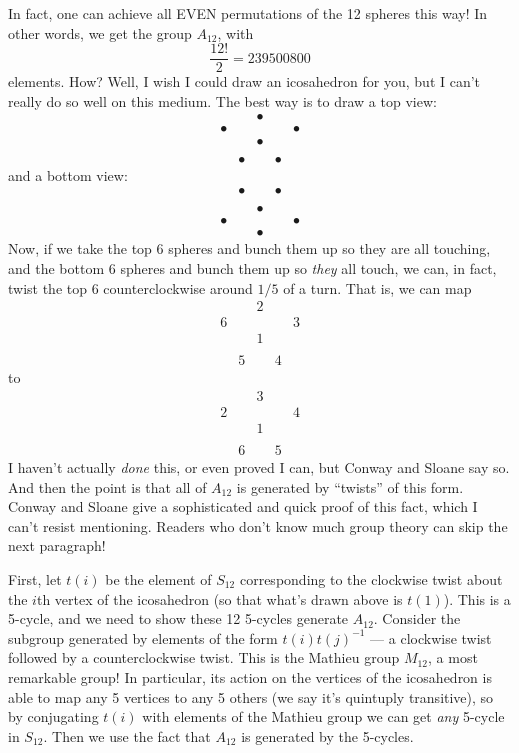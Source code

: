 \documentclass{article}
\begin{document}
In fact, one can achieve all EVEN permutations of the 12 spheres this
way! In other words, we get the group \(A_{12}\), with
\[\frac{12!}{2} = 239500800\] elements. How? Well, I wish I could draw
an icosahedron for you, but I can't really do so well on this medium.
The best way is to draw a top view: \[
  \begin{array}{ccccc}
    &&\bullet&&
  \\\bullet&&&&\bullet
  \\&&\bullet&&
  \\
  \\&\bullet&&\bullet&
  \end{array}
\] and a bottom view: \[
  \begin{array}{ccccc}
    &\bullet&&\bullet&
  \\
  \\&&\bullet&&
  \\\bullet&&&&\bullet
  \\&&\bullet&&
  \end{array}
\] Now, if we take the top 6 spheres and bunch them up so they are all
touching, and the bottom 6 spheres and bunch them up so \emph{they} all
touch, we can, in fact, twist the top 6 counterclockwise around \(1/5\)
of a turn. That is, we can map \[
  \begin{array}{ccccc}
    &&2&&
  \\6&&&&3
  \\&&1&&
  \\
  \\&5&&4&
  \end{array}
\] to \[
  \begin{array}{ccccc}
    &&3&&
  \\2&&&&4
  \\&&1&&
  \\
  \\&6&&5&
  \end{array}
\] I haven't actually \emph{done} this, or even proved I can, but Conway
and Sloane say so. And then the point is that all of \(A_{12}\) is
generated by ``twists'' of this form. Conway and Sloane give a
sophisticated and quick proof of this fact, which I can't resist
mentioning. Readers who don't know much group theory can skip the next
paragraph!

First, let \(t(i)\) be the element of \(S_{12}\) corresponding to the
clockwise twist about the \(i\)th vertex of the icosahedron (so that
what's drawn above is \(t(1)\)). This is a 5-cycle, and we need to show
these 12 5-cycles generate \(A_{12}\). Consider the subgroup generated
by elements of the form \(t(i)t(j)^{-1}\) --- a clockwise twist followed
by a counterclockwise twist. This is the Mathieu group \(M_{12}\), a
most remarkable group! In particular, its action on the vertices of the
icosahedron is able to map any 5 vertices to any 5 others (we say it's
quintuply transitive), so by conjugating \(t(i)\) with elements of the
Mathieu group we can get \emph{any} 5-cycle in \(S_{12}\). Then we use
the fact that \(A_{12}\) is generated by the 5-cycles.
\end{document}
